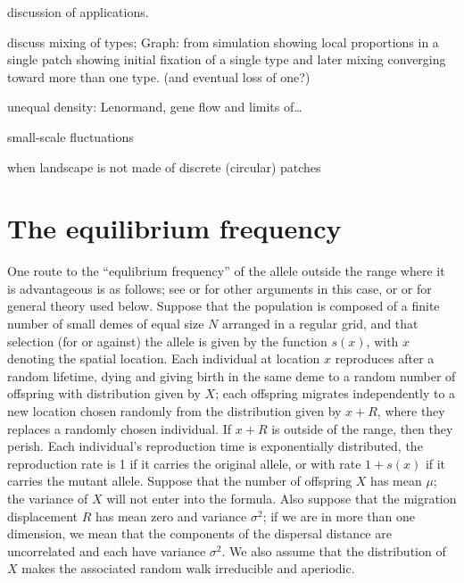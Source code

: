 \documentclass{article}
\begin{document}
discussion of applications. 

discuss mixing of types; 
Graph: from simulation showing local proportions in a single patch showing initial fixation of a single type and later mixing converging toward more than one type.  (and eventual loss of one?)

unequal density: Lenormand, gene flow and limits of\dots

small-scale fluctuations

when landscape is not made of discrete (circular) patches



\appendix


\section{The equilibrium frequency}
\label{apx:eqfreq}

One route to the ``equlibrium frequency'' of the allele outside the range where it is advantageous is as follows;
see \citet{slatkin1973geneflow} or \citet{barton1987establishment,pollak1966survival} for other arguments in this case, 
or \citet{etheridge2000introduction} or \citet{dawson1993measurevalued} for general theory used below.
Suppose that the population is composed of a finite number of small demes of equal size $N$ arranged in a regular grid,
and that selection (for or against) the allele is given by the function $s(x)$, with $x$ denoting the spatial location.
Each individual at location $x$ reproduces after a random lifetime,
dying and giving birth in the same deme to a random number of offspring with distribution given by $X$;
each offspring migrates independently to a new location chosen randomly from the distribution given by $x+R$,
where they replaces a randomly chosen individual.
If $x+R$ is outside of the range, then they perish.
Each individual's reproduction time is exponentially distributed, 
the reproduction rate is 1 if it carries the original allele, or with rate $1+s(x)$ if it carries the mutant allele.
Suppose that the number of offspring $X$ has mean $\mu$; the variance of $X$ will not enter into the formula.
Also suppose that the migration displacement $R$ has mean zero and variance $\sigma^2$;
if we are in more than one dimension, we mean that the components of the dispersal distance are uncorrelated
and each have variance $\sigma^2$.
We also assume that the distribution of $X$ makes the associated random walk irreducible and aperiodic.
\end{document}
